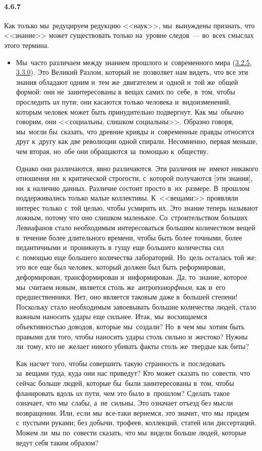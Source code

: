 \paragraph{4.6.7}\hypertarget{par:4.6.7}{} Как только мы~редуцируем редукцию <<наук>>, мы~вынуждены признать, что <<знание>> может существовать только на~уровне следов~--- во~всех смыслах этого термина. 
	\begin{itemize}
	\item 
 Мы~часто различаем между знанием прошлого и~современного мира (\hyperlink{par:3.2.5}{3.2.5}, \hyperlink{par:3.3.0}{3.3.0}). Это Великий Разлом, который не~позволяет нам видеть, что все эти знания обладают одним и~тем же~двигателем и~одной и~той же~общей формой: они не~заинтересованы в~вещах самих по~себе, в~том, чтобы проследить {\itshape их} пути; они касаются только человека и~видоизменений, которым человек может быть принудительно подвергнут. Как мы~обычно говорим, они <<социальны, слишком социальны>>. Образно говоря, мы~могли бы~сказать, что древние кривды и~современные правды относятся друг к~другу как две революции одной спирали. Несомненно, первая меньше, чем вторая, но~обе они обращаются за~помощью к~обществу. 

	Однако они различаются, явно различаются. Эти различия не~имеют никакого отношения ни~к критической строгости, с~которой получаются [эти знания], ни~к наличию данных. Различие состоит просто в~их~размере. В~прошлом поддерживались только малые коллективы. К~<<вещами>> проявляли интерес только с~той целью, чтобы усмирить их. Это знание теперь называют ложным, потому что оно слишком маленькое. Со~строительством больших Левиафанов стало необходимым интересоваться большим количеством вещей в~течение более длительного времени, чтобы быть более точными, более педантичными и~проникнуть в~гущу еще большего количества сил с~помощью еще большего количества лабораторий. Но~цель осталась той же: это все еще был человек, который должен был быть реформирован, деформирован, трансформирован и~информирован. Да, то~знание, которое мы~считаем новым, является столь же~антропо{\itshape{морфным}}, как и~его предшественники. Нет, оно является таковым даже в~большей степени! Поскольку стало необходимым завоевывать большие количества людей, стало важным наносить удары еще сильнее. Итак, мы~восхищаемся объективностью доводов, которые мы~создали? Но~в чем мы~хотим быть правыми для того, чтобы наносить удары столь сильно и~жестоко? Нужны ли~тому, кто не~желает никого убивать факты столь же~твердые как биты? 

	Как насчет того, чтобы совершить такую странность и~последовать за~вещами туда, куда они нас приведут? Кто может сказать по~совести, что сейчас больше людей, которые бы~были заинтересованы в~том, чтобы фланировать вдоль {\itshape их} пути, чем это было в~прошлом? Сделать такое означает, что мы~слабы, а~не~сильны. Это означает отъезд без мысли возвращении. Или, если мы~все-таки вернемся, это значит, что мы~придем с~пустыми руками; без добычи, трофеев, коллекций, статей или диссертаций. Можем ли~мы по~совести сказать, что мы~видели больше людей, которые ведут себя таким образом? 


\end{itemize}

